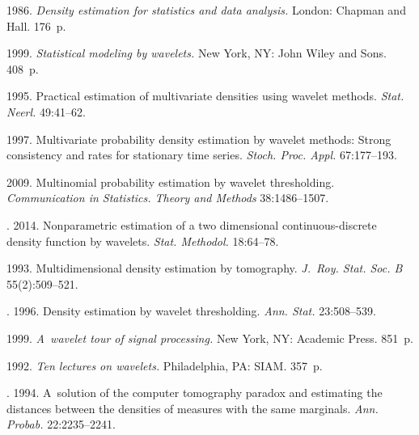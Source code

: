   \begin{multicols}{2}

\renewcommand{\bibname}{\protect\rmfamily References}



{\small\frenchspacing
 {%
 \begin{thebibliography}{99}
 1986. \textit{Density
estimation for statistics and data analysis.} London: Chapman and Hall. 176~p.

 1999. \textit{Statistical modeling by wavelets.} New York, NY:
John Wiley and Sons. 408~p.


 1995. Practical estimation of multivariate densities
using wavelet methods. \textit{Stat. Neerl.} 49:41--62.

 1997. Multivariate probability density estimation by wavelet
methods: Strong consistency and rates for stationary time series.
\textit{Stoch. Proc. Appl.} 67:177--193.

 2009. Multinomial probability estimation
by wavelet thresholding. \textit{Communication in Statistics. Theory and Methods}
 38:1486--1507.

. 2014.
Nonparametric estimation of a two dimensional continuous-discrete
density function by wavelets. \textit{Stat. Methodol.} 18:64--78.



 1993. Multidimensional density
estimation by tomography. \textit{J.~Roy. Stat. Soc. B} 55(2):509--521.

.
1996. Density estimation by wavelet thresholding.
\textit{Ann. Stat.}  23:508--539.

 1999. \textit{A~wavelet tour of signal processing.}
New York, NY: Academic Press. 851~p.

 1992. \textit{Ten lectures on wavelets.}
Philadelphia, PA: SIAM. 357~p.

. 1994. A~solution of the
computer tomography paradox and estimating the distances between the
densities of measures with the same marginals.
\textit{Ann. Probab.} 22:2235--2241.


\end{thebibliography}}}
\end{multicols}
